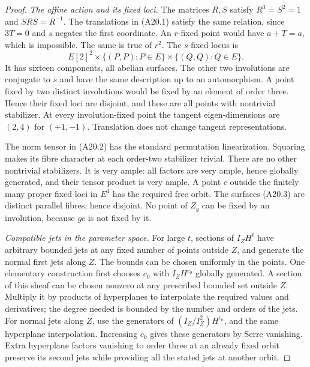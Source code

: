 \documentclass[11pt]{article}
\theoremstyle{remark}\newtheorem{remark}[theorem]{Remark}
\begin{document}
\begin{proof}
\emph{The affine action and its fixed loci.}
The matrices $R,S$ satisfy $R^3=S^2=1$ and $SRS=R^{-1}$.
The translations in (A20.1) satisfy the same relation,
since $3T=0$ and $s$ negates the first coordinate.
An $r$-fixed point would have $a+T=a$, which is impossible.
The same is true of $r^2$.
The $s$-fixed locus is
\[
          E[2]^2\times\{(P,P):P\in E\}
                         \times\{(Q,Q):Q\in E\}.
 \tag{A20.6}
\]
It has sixteen components, all abelian surfaces.
The other two involutions are conjugate to $s$ and
have the same description up to an automorphism.
A point fixed by two distinct involutions would be
fixed by an element of order three. Hence their fixed
loci are disjoint, and these are all points with
nontrivial stabilizer. At every involution-fixed point
the tangent eigen-dimensions are $(2,4)$ for $(+1,-1)$.
Translation does not change tangent representations.

The norm tensor in (A20.2) has the standard permutation
linearization. Squaring makes its fibre character at
each order-two stabilizer trivial. There are no other
nontrivial stabilizers. It is very ample: all factors
are very ample, hence globally generated, and their
tensor product is very ample. A point $c$ outside the
finitely many proper fixed loci in $E^4$ has the required
free orbit. The surfaces (A20.3) are distinct parallel
fibres, hence disjoint. No point of $Z_g$ can be fixed
by an involution, because $gc$ is not fixed by it.

\emph{Compatible jets in the parameter space.}
For large $t$, sections of $I_ZH^t$ have arbitrary
bounded jets at any fixed number of points outside $Z$,
and generate the normal first jets along $Z$.
The bounds can be chosen uniformly in the points.
One elementary construction first chooses $c_0$ with
$I_ZH^{c_0}$ globally generated. A section of this
sheaf can be chosen nonzero at any prescribed bounded
set outside $Z$. Multiply it by products of hyperplanes
to interpolate the required values and derivatives;
the degree needed is bounded by the number and orders
of the jets. For normal jets along $Z$, use the
generators of $(I_Z/I_Z^2)H^{c_0}$, and the same
hyperplane interpolation. Increasing $c_0$ gives
these generators by Serre vanishing. Extra hyperplane
factors vanishing to order three at an already fixed
orbit preserve its second jets while providing all
the stated jets at another orbit.


\end{proof}
\end{document}

